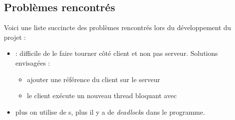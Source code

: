 \subsection{Problèmes rencontrés}

Voici une liste succincte des problèmes rencontrés lors du développement du projet :

\begin{itemize}
    \item {} : difficile de le faire tourner côté client et non pas serveur. Solutions envisagées :
          \begin{itemize}
              \item ajouter une référence du client sur le serveur
              \item le client exécute un nouveau thread bloquant avec 
          \end{itemize}
    \item {} plus on utilise de s, plus il y a de \textit{deadlock}s dans le programme.
\end{itemize}